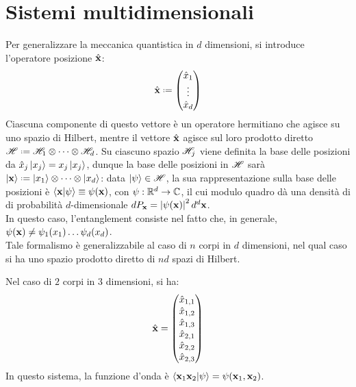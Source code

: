\section{Sistemi multidimensionali}

Per generalizzare la meccanica quantistica in $ d $ dimensioni, si introduce l'operatore posizione $ \hat{\mathbf{x}} $:
\begin{equation}
	\hat{\ve{x}} \defeq
	\begin{pmatrix}
		\hat{x}_1 \\
		\vdots \\
		\hat{x}_d
	\end{pmatrix}
	\label{eq:1}
\end{equation}
Ciascuna componente di questo vettore è un operatore hermitiano che agisce su uno spazio di Hilbert, mentre il vettore $ \hat{\mathbf{x}} $ agisce sul loro prodotto diretto $ \hilb \defeq \hilb_1 \otimes \dots \otimes \hilb_d $. Su ciascuno spazio $ \mathscr{H}_j $ viene definita la base delle posizioni da $ \hat{x}_j \ket{x_j} = x_j \ket{x_j} $, dunque la base delle posizioni in $ \mathscr{H} $ sarà $ \ket{\ve{x}} \defeq \ket{x_1} \otimes \dots \otimes \ket{x_d} $: data $ \ket{\psi} \in \mathscr{H} $, la sua rappresentazione sulla base delle posizioni è $ \braket{\mathbf{x} | \psi} \equiv \psi(\mathbf{x}) $, con $ \psi : \mathbb{R}^d \rightarrow \mathbb{C} $, il cui modulo quadro dà una densità di di probabilità $ d $-dimensionale $ dP_{\mathbf{x}} = \left\lvert\psi(\mathbf{x})\right\rvert^2 d^d\mathbf{x} $.\\
In questo caso, l'entanglement consiste nel fatto che, in generale, $ \psi(\mathbf{x}) \neq \psi_1(x_1) \dots \psi_d(x_d) $.\\
Tale formalismo è generalizzabile al caso di $ n $ corpi in $ d $ dimensioni, nel qual caso si ha uno spazio prodotto diretto di $ nd $ spazi di Hilbert.

\begin{example}
	Nel caso di $ 2 $ corpi in $ 3 $ dimensioni, si ha:
	\begin{equation*}
		\hat{\mathbf{x}} =
		\begin{pmatrix}
			\hat{x}_{1,1} \\
			\hat{x}_{1,2} \\
			\hat{x}_{1,3} \\
			\hat{x}_{2,1} \\
			\hat{x}_{2,2} \\
			\hat{x}_{2,3} \\
		\end{pmatrix}
	\end{equation*}
	In questo sistema, la funzione d'onda è $ \braket{\mathbf{x}_1 \mathbf{x}_2 | \psi} = \psi(\mathbf{x}_1, \mathbf{x}_2) $.
\end{example}


